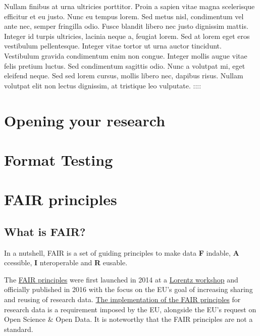 \documentclass[
]{book}
\begin{document}
Nullam finibus at urna ultricies porttitor. Proin a sapien vitae magna scelerisque efficitur et eu justo. Nunc eu tempus lorem. Sed metus nisl, condimentum vel ante nec, semper fringilla odio. Fusce blandit libero nec justo dignissim mattis. Integer id turpis ultricies, lacinia neque a, feugiat lorem. Sed at lorem eget eros vestibulum pellentesque. Integer vitae tortor ut urna auctor tincidunt. Vestibulum gravida condimentum enim non congue. Integer mollis augue vitae felis pretium luctus. Sed condimentum sagittis odio. Nunc a volutpat mi, eget eleifend neque. Sed sed lorem cursus, mollis libero nec, dapibus risus. Nullam volutpat elit non lectus dignissim, at tristique leo vulputate.
::::

\hypertarget{opening-your-research}{%
\chapter{Opening your research}\label{opening-your-research}}

\hypertarget{format-testing}{%
\chapter{Format Testing}\label{format-testing}}

\hypertarget{fair-principles-1}{%
\chapter{FAIR principles}\label{fair-principles-1}}

\hypertarget{what-is-fair-1}{%
\section{What is FAIR?}\label{what-is-fair-1}}

In a nutshell, FAIR is a set of guiding principles to make data \textbf{F} indable, \textbf{A} ccessible, \textbf{I} nteroperable and \textbf{R} eusable.

The \href{https://www.go-fair.org/fair-principles/}{FAIR principles} were first launched in 2014 at a \href{https://www.lorentzcenter.nl/}{Lorentz workshop} and officially published in 2016 with the focus on the EU's goal of increasing sharing and reusing of research data. \href{https://eur-lex.europa.eu/legal-content/EN/TXT/?uri=uriserv:OJ.L_.2019.172.01.0056.01.ENG}{The implementation of the FAIR principles} for research data is a requirement imposed by the EU, alongside the EU's request on Open Science \& Open Data. It is noteworthy that the FAIR principles are not a standard.
\end{document}
